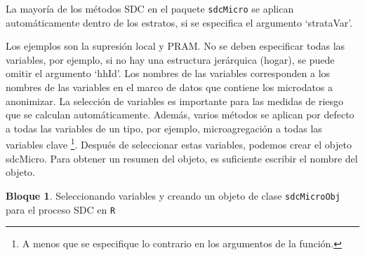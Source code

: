 \documentclass[]{book}
\theoremstyle{definition}
\theoremstyle{definition}
\newtheorem{example}{Bloque}[chapter]
\theoremstyle{definition}
\theoremstyle{definition}
\theoremstyle{remark}
\begin{document}
La mayoría de los métodos SDC en el paquete \texttt{sdcMicro} se aplican automáticamente dentro de los estratos, si se especifica el argumento `strataVar'.

Los ejemplos son la supresión local y PRAM. No se deben especificar todas las variables, por ejemplo, si no hay una estructura jerárquica (hogar), se puede omitir el argumento `hhId'. Los nombres de las variables corresponden a los nombres de las variables en el marco de datos que contiene los microdatos a anonimizar. La selección de variables es importante para las medidas de riesgo que se calculan automáticamente. Además, varios métodos se aplican por defecto a todas las variables de un tipo, por ejemplo, microagregación a todas las variables clave \footnote{A menos que se especifique lo contrario en los argumentos de la función.}. Después de seleccionar estas variables, podemos crear el objeto sdcMicro. Para obtener un resumen del objeto, es suficiente escribir el nombre del objeto.

\begin{example}
\protect\hypertarget{exm:bloqueMicro8}{}{\label{exm:bloqueMicro8} }Seleccionando variables y creando un objeto de clase \texttt{sdcMicroObj} para el proceso SDC en \texttt{R}
\end{example}
\end{document}
